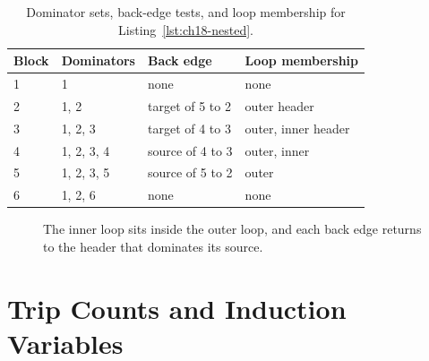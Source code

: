 \begin{table}
  \centering
  \caption{Dominator sets, back-edge tests, and loop membership for Listing~\ref{lst:ch18-nested}.}
  \label{tab:ch18-dom-loops}
  \begin{tabular}{llll}
    \toprule
    Block & Dominators & Back edge & Loop membership \\
    \midrule
    1 & 1 & none & none \\
    2 & 1, 2 & target of 5 to 2 & outer header \\
    3 & 1, 2, 3 & target of 4 to 3 & outer, inner header \\
    4 & 1, 2, 3, 4 & source of 4 to 3 & outer, inner \\
    5 & 1, 2, 3, 5 & source of 5 to 2 & outer \\
    6 & 1, 2, 6 & none & none \\
    \bottomrule
  \end{tabular}
\end{table}

\begin{figure}
  \centering
  \caption{The inner loop sits inside the outer loop, and each back edge returns to the header that dominates its source.}
  \label{fig:ch18-nested}
\end{figure}

\section{Trip Counts and Induction Variables}
\label{sec:ch18-induction}

